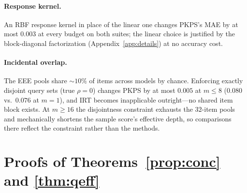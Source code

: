 \documentclass{article}
\theoremstyle{definition}
\theoremstyle{remark}
\theoremstyle{plain}
\newcommand{\PKPS}{PKPS\xspace}
\begin{document}
\paragraph{Response kernel.} An RBF response kernel in place of the linear one changes
\PKPS's MAE by at most $0.003$ at every budget on both suites; the linear choice is
justified by the block-diagonal factorization (Appendix~\ref{app:details}) at no
accuracy cost.

\paragraph{Incidental overlap.} The EEE pools share ${\sim}10\%$ of items across
models by chance. Enforcing exactly disjoint query sets (true $\rho=0$) changes \PKPS
by at most $0.005$ at $m\le8$ ($0.080$ vs.\ $0.076$ at $m{=}1$), and IRT becomes
inapplicable outright---no shared item block exists. At $m\ge16$ the disjointness
constraint exhausts the $32$-item pools and mechanically shortens the sample score's
effective depth, so comparisons there reflect the constraint rather than the methods.

\section{Proofs of Theorems~\ref{prop:conc} and \ref{thm:qeff}}
\label{app:proof}
\end{document}
